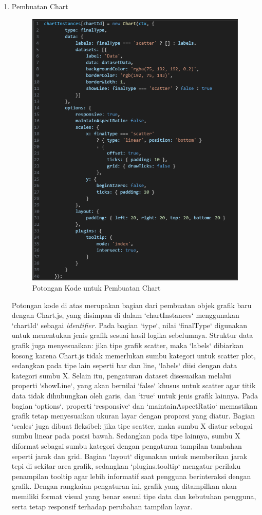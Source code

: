 \begin{enumerate}
	\item Pembuatan Chart
		\begin{figure}[H]
		\centering
		\includegraphics[width=0.8\linewidth]{gambar/Pembahasan/Chartinstance cjs.png}
		\caption{Potongan Kode untuk Pembuatan Chart}
		\label{Potongan Kode untuk Pembuatan Chart}
	\end{figure}
	Potongan kode di atas merupakan bagian dari pembuatan objek grafik baru dengan Chart.js, yang disimpan di dalam `chartInstances` menggunakan `chartId` sebagai \textit{identifier}. Pada bagian `type`, nilai `finalType` digunakan untuk menentukan jenis grafik sesuai hasil logika sebelumnya. Struktur data grafik juga menyesuaikan: jika tipe grafik scatter, maka `labels` dibiarkan kosong karena Chart.js tidak memerlukan sumbu kategori untuk scatter plot, sedangkan pada tipe lain seperti bar dan line, `labels` diisi dengan data kategori sumbu X. Selain itu, pengaturan dataset disesuaikan melalui properti `showLine`, yang akan bernilai `false` khusus untuk scatter agar titik data tidak dihubungkan oleh garis, dan `true` untuk jenis grafik lainnya. Pada bagian `options`, properti `responsive` dan `maintainAspectRatio` memastikan grafik tetap menyesuaikan ukuran layar dengan proporsi yang diatur. Bagian `scales` juga dibuat fleksibel: jika tipe scatter, maka sumbu X diatur sebagai sumbu linear pada posisi bawah. Sedangkan pada tipe lainnya, sumbu X diformat sebagai sumbu kategori dengan pengaturan tampilan tambahan seperti jarak dan grid. Bagian `layout` digunakan untuk memberikan jarak tepi di sekitar area grafik, sedangkan `plugins.tooltip` mengatur perilaku penampilan tooltip agar lebih informatif saat pengguna berinteraksi dengan grafik. Dengan rangkaian pengaturan ini, grafik yang ditampilkan akan memiliki format visual yang benar sesuai tipe data dan kebutuhan pengguna, serta tetap responsif terhadap perubahan tampilan layar.
	

\end{enumerate}
